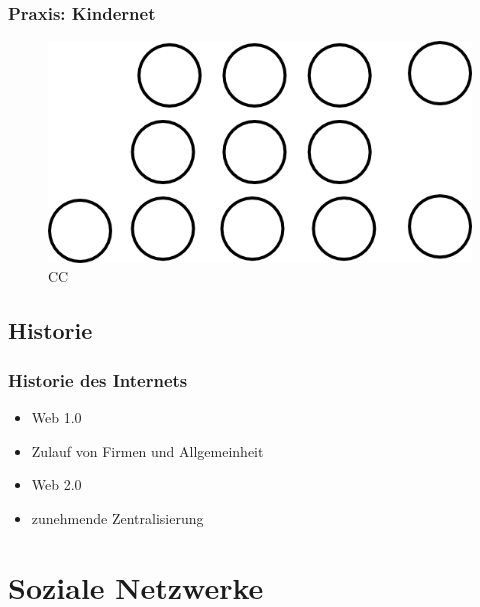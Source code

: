 \documentclass{beamer}
\begin{document}
\begin{frame}
  \frametitle{Praxis: Kindernet}
  \begin{figure}
      \includegraphics[height=0.7\textheight]{img/kindernet.png}
      \caption{CC}
  \end{figure}
\end{frame}

\subsection{Historie}

\begin{frame}
  \frametitle{Historie des Internets}
  \begin{itemize}
    \item<2-> Web 1.0
    \item<3-> Zulauf von Firmen und Allgemeinheit
    \item<4-> Web 2.0
    \item zunehmende Zentralisierung
  \end{itemize}
\end{frame}

\section{Soziale Netzwerke}
\end{document}
